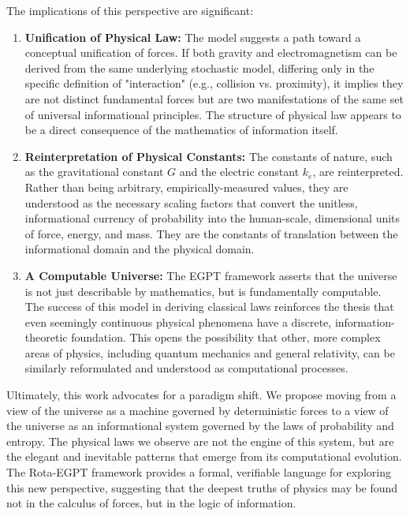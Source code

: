 \documentclass[11pt, letterpaper]{article}
\begin{document}
The implications of this perspective are significant:

\begin{enumerate}
    \item \textbf{Unification of Physical Law:} The model suggests a path toward a conceptual unification of forces. If both gravity and electromagnetism can be derived from the same underlying stochastic model, differing only in the specific definition of "interaction" (e.g., collision vs. proximity), it implies they are not distinct fundamental forces but are two manifestations of the same set of universal informational principles. The structure of physical law appears to be a direct consequence of the mathematics of information itself.

    \item \textbf{Reinterpretation of Physical Constants:} The constants of nature, such as the gravitational constant $G$ and the electric constant $k_e$, are reinterpreted. Rather than being arbitrary, empirically-measured values, they are understood as the necessary scaling factors that convert the unitless, informational currency of probability into the human-scale, dimensional units of force, energy, and mass. They are the constants of translation between the informational domain and the physical domain.

    \item \textbf{A Computable Universe:} The EGPT framework asserts that the universe is not just describable by mathematics, but is fundamentally computable. The success of this model in deriving classical laws reinforces the thesis that even seemingly continuous physical phenomena have a discrete, information-theoretic foundation. This opens the possibility that other, more complex areas of physics, including quantum mechanics and general relativity, can be similarly reformulated and understood as computational processes.
\end{enumerate}

Ultimately, this work advocates for a paradigm shift. We propose moving from a view of the universe as a machine governed by deterministic forces to a view of the universe as an informational system governed by the laws of probability and entropy. The physical laws we observe are not the engine of this system, but are the elegant and inevitable patterns that emerge from its computational evolution. The Rota-EGPT framework provides a formal, verifiable language for exploring this new perspective, suggesting that the deepest truths of physics may be found not in the calculus of forces, but in the logic of information.
\end{document}

